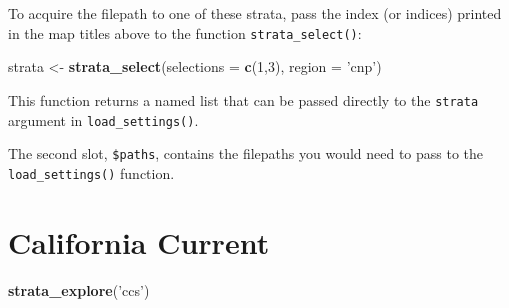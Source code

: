 \documentclass[
]{book}
\newenvironment{Shaded}{\begin{snugshade}}{\end{snugshade}}
\newcommand{\DataTypeTok}[1]{\textcolor[rgb]{0.13,0.29,0.53}{#1}}
\newcommand{\DecValTok}[1]{\textcolor[rgb]{0.00,0.00,0.81}{#1}}
\newcommand{\KeywordTok}[1]{\textcolor[rgb]{0.13,0.29,0.53}{\textbf{#1}}}
\newcommand{\NormalTok}[1]{#1}
\newcommand{\OperatorTok}[1]{\textcolor[rgb]{0.81,0.36,0.00}{\textbf{#1}}}
\newcommand{\StringTok}[1]{\textcolor[rgb]{0.31,0.60,0.02}{#1}}
\begin{document}
To acquire the filepath to one of these strata, pass the index (or indices) printed in the map titles above to the function \texttt{strata\_select()}:

\begin{Shaded}
\begin{Highlighting}[]
\NormalTok{strata <-}\StringTok{ }\KeywordTok{strata_select}\NormalTok{(}\DataTypeTok{selections =} \KeywordTok{c}\NormalTok{(}\DecValTok{1}\NormalTok{,}\DecValTok{3}\NormalTok{),}
                              \DataTypeTok{region =} \StringTok{'cnp'}\NormalTok{)}
\end{Highlighting}
\end{Shaded}

This function returns a named list that can be passed directly to the \texttt{strata} argument in \texttt{load\_settings()}.

\begin{Shaded}
\end{Shaded}

The second slot, \texttt{\$paths}, contains the filepaths you would need to pass to the \texttt{load\_settings()} function.

\hypertarget{california-current}{%
\section*{California Current}\label{california-current}}

\begin{Shaded}
\begin{Highlighting}[]
\KeywordTok{strata_explore}\NormalTok{(}\StringTok{'ccs'}\NormalTok{)}
\end{Highlighting}
\end{Shaded}
\end{document}
